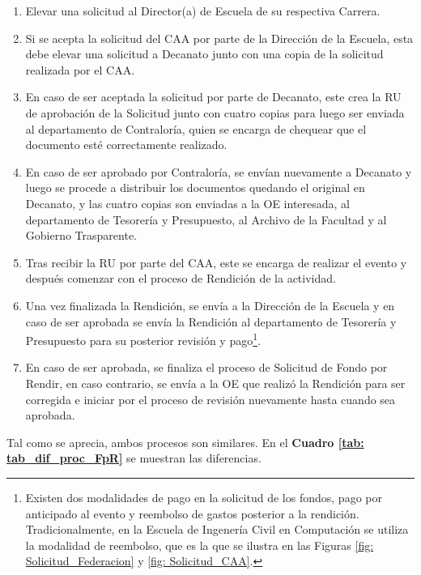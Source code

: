 \begin{enumerate}
    \item Elevar una solicitud al Director(a) de Escuela de su respectiva Carrera. 
    \item Si se acepta la solicitud del CAA por parte de la Dirección de la Escuela, esta debe elevar una solicitud a Decanato junto con una copia de la solicitud realizada por el CAA. 
    \item En caso de ser aceptada la solicitud por parte de Decanato, este crea la RU de aprobación de la Solicitud junto con cuatro copias para luego ser enviada al departamento de Contraloría, quien se encarga de chequear que el documento esté correctamente realizado. 
    \item En caso de ser aprobado por Contraloría, se envían nuevamente a Decanato y luego se procede a distribuir los documentos quedando el original en Decanato, y las cuatro copias son enviadas a la OE interesada, al departamento de Tesorería y Presupuesto, al Archivo de la Facultad y al Gobierno Trasparente.
    \item Tras recibir la RU por parte del CAA, este se encarga de realizar el evento y después comenzar con el proceso de Rendición de la actividad. 
    \item Una vez finalizada la Rendición, se envía a la Dirección de la Escuela y en caso de ser aprobada se envía la Rendición al departamento de Tesorería y Presupuesto para su posterior revisión y pago\footnote{Existen dos modalidades de pago en la solicitud de los fondos, pago por anticipado al evento y reembolso de gastos posterior a la rendición. Tradicionalmente, en la Escuela de Ingenería Civil en Computación se utiliza la modalidad de reembolso, que es la que se ilustra en las Figuras \ref{fig: Solicitud_Federacion} y \ref{fig: Solicitud_CAA}.}.
    \item En caso de ser aprobada, se finaliza el proceso de Solicitud de Fondo por Rendir, en caso contrario, se envía a la OE que realizó la Rendición para ser corregida e iniciar por el proceso de revisión nuevamente hasta cuando sea aprobada.
\end{enumerate}


Tal como se aprecia, ambos procesos son similares. En el \textbf{Cuadro \ref{tab: tab_dif_proc_FpR}} se muestran las diferencias.

